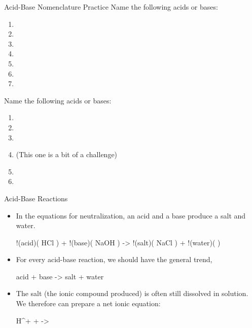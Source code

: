 \documentclass[11pt,letterpaper]{article}
\begin{document}
\begin{frame}[t]{Acid-Base Nomenclature Practice}
	Name the following acids or bases:

	\begin{enumerate}
		\item {} 
		\item {} 
		\item {} 
		\item {} 
		\item {} 
		\item {} 
		\item {} 
	\end{enumerate}
\end{frame}

\begin{onyourown}[0em]
	Name the following acids or bases:
	
	\begin{enumerate}
		\item {}
		\item {}
		\item {}
		\item {} (This one is a bit of a challenge)
		\item {}
		\item {}
	\end{enumerate}
\end{onyourown}

\begin{frame}{Acid-Base Reactions}
	\begin{itemize}
		\item In the equations for neutralization, an acid and a base
			produce a salt and water.
			\begin{reaction*}
				!(acid)( HCl\aq{} ) + !(base)( NaOH\aq{} ) ->
				!(salt)( NaCl\aq{} ) + !(water)( \water\lqd{} )
			\end{reaction*}

		\item For \alert{every} acid-base reaction, we should have the
			general trend,
			\begin{reaction*}
				acid + base -> salt + water
			\end{reaction*}

		\item The \alert{salt} (the ionic compound produced) is often
			still dissolved in solution. We therefore can prepare a
			\alert{net ionic equation}:
			\begin{reaction*}
				H^{+}\aq{} + \Hyd\aq{} -> \water\lqd{}
			\end{reaction*}
	\end{itemize}
\end{frame}
\end{document}
